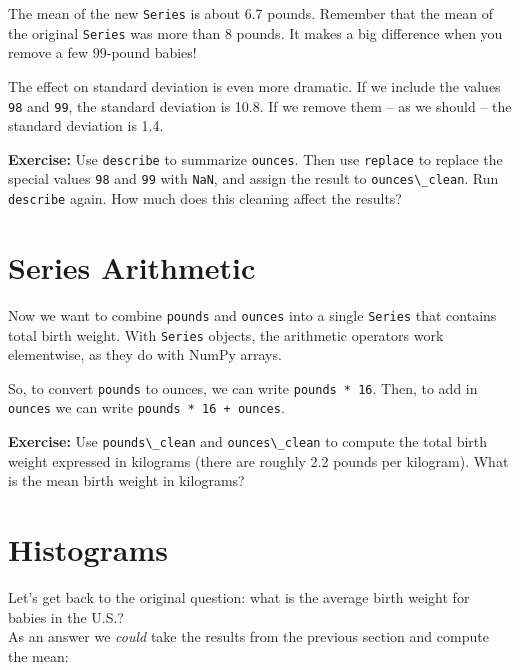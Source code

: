 The mean of the new \passthrough{\lstinline!Series!} is about 6.7
pounds. Remember that the mean of the original
\passthrough{\lstinline!Series!} was more than 8 pounds. It makes a big
difference when you remove a few 99-pound babies!

The effect on standard deviation is even more dramatic. If we include
the values \passthrough{\lstinline!98!} and
\passthrough{\lstinline!99!}, the standard deviation is 10.8. If we
remove them -- as we should -- the standard deviation is 1.4.

\textbf{Exercise:} Use \passthrough{\lstinline!describe!} to summarize
\passthrough{\lstinline!ounces!}. Then use
\passthrough{\lstinline!replace!} to replace the special values
\passthrough{\lstinline!98!} and \passthrough{\lstinline!99!} with
\passthrough{\lstinline!NaN!}, and assign the result to
\passthrough{\lstinline!ounces\_clean!}. Run
\passthrough{\lstinline!describe!} again. How much does this cleaning
affect the results?

\section{Series Arithmetic}\label{series-arithmetic}

Now we want to combine \passthrough{\lstinline!pounds!} and
\passthrough{\lstinline!ounces!} into a single
\passthrough{\lstinline!Series!} that contains total birth weight. With
\passthrough{\lstinline!Series!} objects, the arithmetic operators work
elementwise, as they do with NumPy arrays.

So, to convert \passthrough{\lstinline!pounds!} to ounces, we can write
\passthrough{\lstinline!pounds * 16!}. Then, to add in
\passthrough{\lstinline!ounces!} we can write
\passthrough{\lstinline!pounds * 16 + ounces!}.

\textbf{Exercise:} Use \passthrough{\lstinline!pounds\_clean!} and
\passthrough{\lstinline!ounces\_clean!} to compute the total birth
weight expressed in kilograms (there are roughly 2.2 pounds per
kilogram). What is the mean birth weight in kilograms?

\section{Histograms}\label{histograms}

Let's get back to the original question: what is the average birth
weight for babies in the U.S.?\\
As an answer we \emph{could} take the results from the previous section
and compute the mean:

